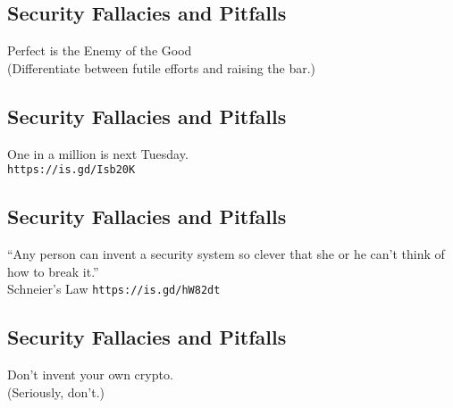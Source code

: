 \documentclass[xga]{xdvislides}
\begin{document}
\subsection{Security Fallacies and Pitfalls}
\vspace*{\fill}
\begin{center}
    \Hugesize
        Perfect is the Enemy of the Good \\
	\vspace{.25in}
	\Normalsize
	(Differentiate between futile efforts and raising the bar.)
\end{center}
\vspace*{\fill}

\subsection{Security Fallacies and Pitfalls}
\vspace*{\fill}
\begin{center}
    \Hugesize
        One in a million is next Tuesday. \\
	\vspace{.25in}
	\Normalsize
	\verb+https://is.gd/Isb20K+
\end{center}
\vspace*{\fill}

\subsection{Security Fallacies and Pitfalls}
\vspace*{\fill}
\begin{center}
    \Hugesize
        ``Any person can invent a security system so clever that she or he
can't think of how to break it.'' \\
	\vspace{.25in}
	\Normalsize
	Schneier's Law \verb+https://is.gd/hW82dt+
\end{center}
\vspace*{\fill}

\subsection{Security Fallacies and Pitfalls}
\vspace*{\fill}
\begin{center}
    \Hugesize
        Don't invent your own crypto. \\
	\vspace{.25in}
	\Normalsize
	(Seriously, don't.)
\end{center}
\vspace*{\fill}
\end{document}
